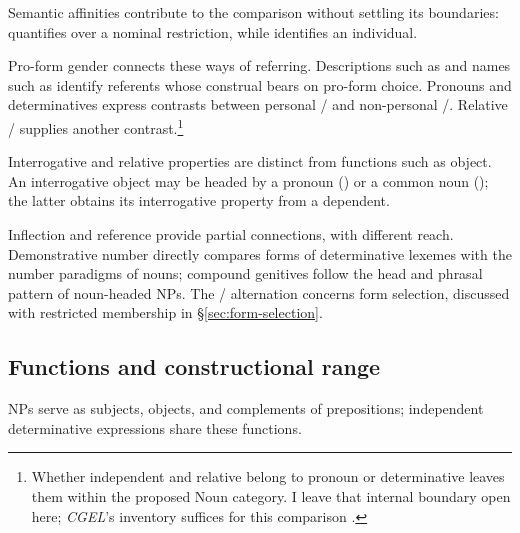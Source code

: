 \documentclass[12pt]{article}
\begin{document}
Semantic affinities contribute to the comparison without settling its boundaries:  quantifies over a nominal restriction, while  identifies an individual.

Pro-form gender \citep{reynolds2025proformgender} connects these ways of referring. Descriptions such as  and names such as  identify referents whose construal bears on pro-form choice. Pronouns and determinatives express contrasts between personal / and non-personal /. Relative / supplies another contrast.\footnote{Whether independent  and relative  belong to pronoun or determinative leaves them within the proposed Noun category. I leave that internal boundary open here; \textit{CGEL}'s inventory suffices for this comparison \citep[397--399]{huddleston2002}.}

Interrogative and relative properties are distinct from functions such as object. An interrogative object may be headed by a pronoun () or a common noun (); the latter obtains its interrogative property from a dependent.

Inflection and reference provide partial connections, with different reach. Demonstrative number directly compares forms of determinative lexemes with the number paradigms of nouns; compound genitives follow the head and phrasal pattern of noun-headed NPs. The /\allowbreak{} alternation concerns form selection, discussed with restricted membership in §\ref{sec:form-selection}.

\subsection{Functions and constructional range}\label{sec:independent}

NPs serve as subjects, objects, and complements of prepositions; independent determinative expressions share these functions.
\end{document}
